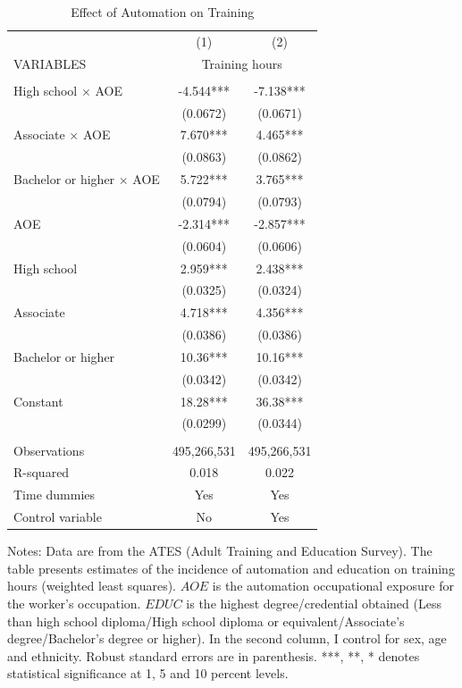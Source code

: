 \documentclass[12pt]{article}
\begin{document}
\begin{table}[h!]
\begin{center}
\scriptsize
\begin{tabular}{lcc} \hline \hline
 & (1) & (2) \\
VARIABLES & \multicolumn{2}{c}{Training hours} \\ \hline
 &  &  \\
High school $\times$ AOE & -4.544*** & -7.138*** \\
 & (0.0672) & (0.0671) \\
Associate $\times$ AOE  & 7.670*** & 4.465*** \\
 & (0.0863) & (0.0862) \\
Bachelor or higher $\times$ AOE & 5.722*** & 3.765*** \\
 & (0.0794) & (0.0793) \\
AOE & -2.314*** & -2.857*** \\
 & (0.0604) & (0.0606) \\
High school  & 2.959*** & 2.438*** \\
 & (0.0325) & (0.0324) \\
Associate & 4.718*** & 4.356*** \\
 & (0.0386) & (0.0386) \\
Bachelor or higher & 10.36*** & 10.16*** \\
 & (0.0342) & (0.0342) \\
Constant & 18.28*** & 36.38*** \\
 & (0.0299) & (0.0344) \\
 &  &  \\
Observations & 495,266,531 & 495,266,531 \\
 R-squared & 0.018 & 0.022 \\ \hline
  Time dummies & Yes & Yes \\
 Control variable & No & Yes \\  \hline
\end{tabular}
\end{center}
\caption{Effect of Automation on Training}
\label{estimation5}
{\scriptsize Notes: Data are from the ATES (Adult Training and Education Survey). The table presents estimates of the incidence of automation and education on training hours (weighted least squares). $AOE$ is the automation occupational exposure for the worker's occupation. $EDUC$ is the highest degree/credential obtained (Less than high school diploma/High school diploma or equivalent/Associate's degree/Bachelor's degree or higher). In the second column, I control for sex, age and ethnicity. Robust standard errors are in parenthesis. ***, **, * denotes statistical significance at 1, 5 and 10 percent levels.}
\end{table}
\end{document}
